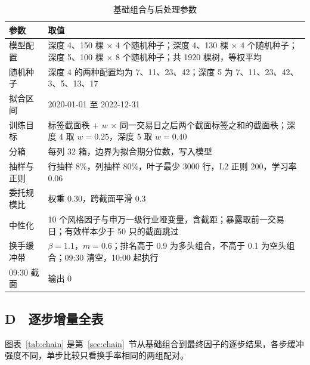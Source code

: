 \documentclass[UTF8,a4paper,zihao=-4,fontset=none]{ctexart}
\newcommand{\tablesetup}{\small\linespread{1.08}\selectfont\renewcommand{\arraystretch}{1.22}}
\begin{document}
\begin{table}[htbp]
\caption{基础组合与后处理参数}\label{tab:params}
\centering
{\tablesetup
\begin{tabularx}{\textwidth}{@{}P{3.4cm} L@{}}
\toprule
参数 & 取值\\
\midrule
模型配置 & 深度 4、150 棵 × 4 个随机种子；深度 4、130 棵 × 4 个随机种子；深度 5、100 棵 × 8 个随机种子；共 1920 棵树，等权平均\\
随机种子 & 深度 4 的两种配置均为 7、11、23、42；深度 5 为 7、11、23、42、3、5、13、17\\
拟合区间 & 2020-01-01 至 2022-12-31\\
训练目标 & 标签截面秩 + $w$ × 同一交易日之后两个截面标签之和的截面秩；深度 4 取 $w=0.25$，深度 5 取 $w=0.40$\\
分箱 & 每列 32 箱，边界为拟合期分位数，写入模型\\
抽样与正则 & 行抽样 8\%，列抽样 80\%，叶子最少 3000 行，L2 正则 200，学习率 0.06\\
委托规模比 & 权重 0.30，跨截面平滑 0.3\\
中性化 & 10 个风格因子与申万一级行业哑变量，含截距；暴露取前一交易日；有效样本少于 50 只的截面跳过\\
换手缓冲带 & $\beta=1.1$，$m=0.6$；排名高于 0.9 为多头组合，不高于 0.1 为空头组合；09:30 清空，10:00 起执行\\
09:30 截面 & 输出 0\\
\bottomrule
\end{tabularx}}
\end{table}

\subsection*{D　逐步增量全表}

图表~\ref{tab:chain} 是第~\ref{sec:chain}~节从基础组合到最终因子的逐步结果，各步缓冲强度不同，单步比较只看换手率相同的两组配对。
\end{document}
